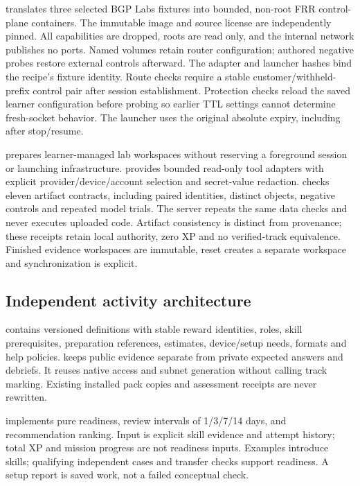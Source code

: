  translates three selected BGP Labs fixtures into
bounded, non-root FRR control-plane containers. The immutable image and source
license are independently pinned. All capabilities are dropped, roots are read
only, and the internal network publishes no ports. Named volumes retain router
configuration; authored negative probes restore external controls afterward.
The adapter and launcher hashes bind the recipe's fixture identity.
Route checks require a stable customer/withheld-prefix control pair after
session establishment. Protection checks reload the saved learner configuration
before probing so earlier TTL settings cannot determine fresh-socket behavior.
The launcher uses the original absolute expiry, including after stop/resume.

 prepares learner-managed lab workspaces
without reserving a foreground session or launching infrastructure.
 provides bounded read-only tool adapters
with explicit provider/device/account selection and secret-value redaction.
 checks eleven artifact contracts, including
paired identities, distinct objects, negative controls and repeated model trials.
The server repeats the same data checks and never executes uploaded code.
Artifact consistency is distinct from provenance; these receipts retain local
authority, zero XP and no verified-track equivalence. Finished evidence workspaces
are immutable, reset creates a separate workspace and synchronization is explicit.

\subsection{Independent activity architecture}
 contains versioned definitions with stable
reward identities, roles, skill prerequisites, preparation references, estimates,
device/setup needs, formats and help policies. 
keeps public evidence separate from private expected answers and debriefs. It
reuses native access and subnet generation without calling track marking. Existing
installed pack copies and assessment receipts are never rewritten.

 implements pure readiness, review intervals of
1/3/7/14 days, and recommendation ranking. Input is explicit skill evidence and
attempt history; total XP and mission progress are not readiness inputs. Examples
introduce skills; qualifying independent cases and transfer checks support
readiness. A setup report is saved work, not a failed conceptual check.


